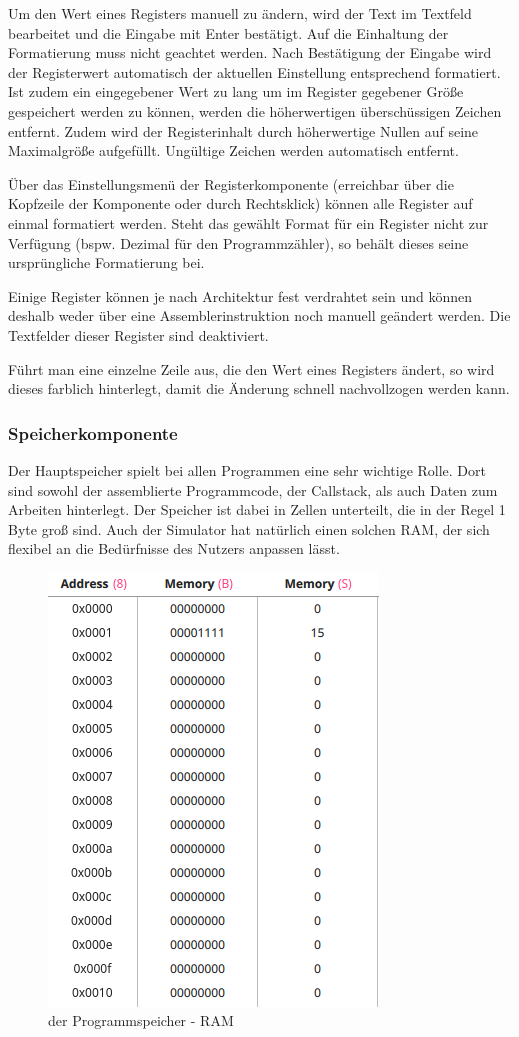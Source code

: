 Um den Wert eines Registers manuell zu ändern, wird der Text im Textfeld bearbeitet und die Eingabe mit Enter bestätigt. Auf die Einhaltung der Formatierung muss nicht geachtet werden. Nach Bestätigung der Eingabe wird der Registerwert automatisch der aktuellen Einstellung entsprechend formatiert. Ist zudem ein eingegebener Wert zu lang um im Register gegebener Größe gespeichert werden zu können, werden die höherwertigen überschüssigen Zeichen entfernt. Zudem wird der Registerinhalt durch höherwertige Nullen auf seine Maximalgröße aufgefüllt. Ungültige Zeichen werden automatisch entfernt.

Über das Einstellungsmenü der Registerkomponente (erreichbar über die Kopfzeile der Komponente oder durch Rechtsklick) können alle Register auf einmal formatiert werden. Steht das gewählt Format für ein Register nicht zur Verfügung (bspw. Dezimal für den Programmzähler), so behält dieses seine ursprüngliche Formatierung bei.

Einige Register können je nach Architektur fest verdrahtet sein und können deshalb weder über eine Assemblerinstruktion noch manuell geändert werden. Die Textfelder dieser Register sind deaktiviert.

Führt man eine einzelne Zeile aus, die den Wert eines Registers ändert, so wird dieses farblich hinterlegt, damit die Änderung schnell nachvollzogen werden kann.


\subsubsection{Speicherkomponente}
Der Hauptspeicher spielt bei allen Programmen eine sehr wichtige Rolle.
Dort sind sowohl der assemblierte Programmcode, der Callstack, als auch Daten zum Arbeiten hinterlegt.
Der Speicher ist dabei in Zellen unterteilt, die in der Regel 1 Byte groß sind.
Auch der Simulator hat natürlich einen solchen RAM, der sich flexibel an die Bedürfnisse des Nutzers anpassen lässt.

\begin{figure}[ht]
	\centering
  \includegraphics[scale=1]{Images/Memory}
	\caption{der Programmspeicher - RAM}
	\label{Memory}
\end{figure}

